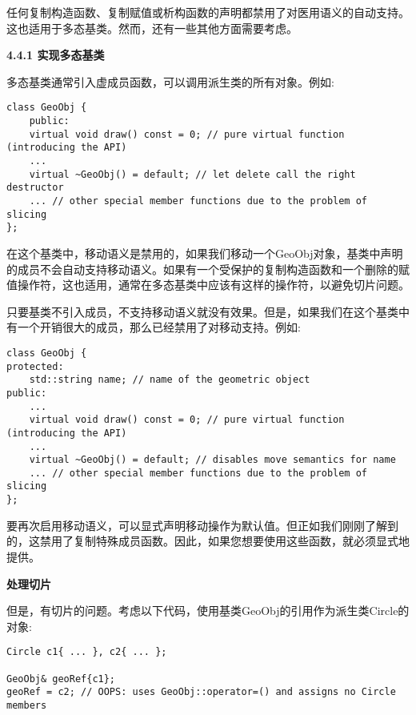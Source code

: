 任何复制构造函数、复制赋值或析构函数的声明都禁用了对医用语义的自动支持。这也适用于多态基类。然而，还有一些其他方面需要考虑。\par

\hspace*{\fill} \par %
\textbf{4.4.1 实现多态基类}

多态基类通常引入虚成员函数，可以调用派生类的所有对象。例如:\par

\begin{lstlisting}[caption={}]
class GeoObj {
	public:
	virtual void draw() const = 0; // pure virtual function (introducing the API)
	...
	virtual ~GeoObj() = default; // let delete call the right destructor
	... // other special member functions due to the problem of slicing
};
\end{lstlisting}

在这个基类中，移动语义是禁用的，如果我们移动一个GeoObj对象，基类中声明的成员不会自动支持移动语义。如果有一个受保护的复制构造函数和一个删除的赋值操作符，这也适用，通常在多态基类中应该有这样的操作符，以避免切片问题。\par

只要基类不引入成员，不支持移动语义就没有效果。但是，如果我们在这个基类中有一个开销很大的成员，那么已经禁用了对移动支持。例如:\par

\begin{lstlisting}[caption={}]
class GeoObj {
protected:
	std::string name; // name of the geometric object
public:
	...
	virtual void draw() const = 0; // pure virtual function (introducing the API)
	...
	virtual ~GeoObj() = default; // disables move semantics for name
	... // other special member functions due to the problem of slicing
};
\end{lstlisting}

要再次启用移动语义，可以显式声明移动操作为默认值。但正如我们刚刚了解到的，这禁用了复制特殊成员函数。因此，如果您想要使用这些函数，就必须显式地提供。\par

\hspace*{\fill} \par %
\textbf{处理切片}

但是，有切片的问题。考虑以下代码，使用基类GeoObj的引用作为派生类Circle的对象:\par

\begin{lstlisting}[caption={}]
Circle c1{ ... }, c2{ ... };

GeoObj& geoRef{c1};
geoRef = c2; // OOPS: uses GeoObj::operator=() and assigns no Circle members
\end{lstlisting}

